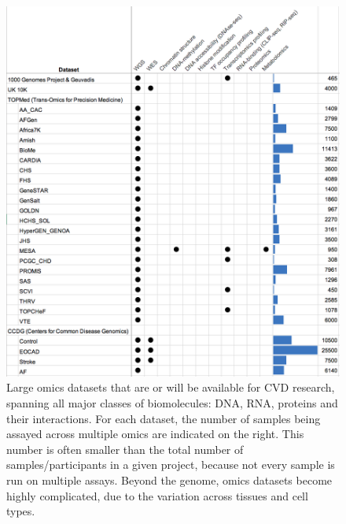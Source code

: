 \documentclass[letter]{bioinfo}
\begin{document}
	\begin{figure}[!tpb]
	\includegraphics[width=1\linewidth]{trans-omics-data-sets.png}
		\caption{Large omics datasets that are or will be available for CVD research, spanning all major classes of biomolecules: DNA, RNA, proteins and their interactions. For each dataset, the number of samples being assayed across multiple omics are indicated on the right. This number is often smaller than the total number of samples/participants in a given project, because not every sample is run on multiple assays. Beyond the genome, omics datasets become highly complicated, due to the variation across tissues and cell types.}
		\label{fig:trans-omics}
	\end{figure} 
	
\end{document}
